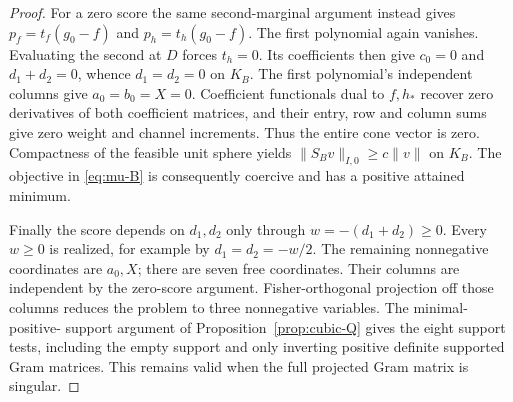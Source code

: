 \begin{proof}
For a zero score the same second-marginal argument instead gives
$p_f=t_f(g_0-f)$ and $p_h=t_h(g_0-f)$. The first polynomial again
vanishes. Evaluating the second at $D$ forces $t_h=0$. Its coefficients
then give $c_0=0$ and $d_1+d_2=0$, whence $d_1=d_2=0$ on $K_B$.
The first polynomial's independent columns give $a_0=b_0=X=0$.
Coefficient functionals dual to $f,h_*$ recover zero derivatives of both
coefficient matrices, and their entry, row and column sums give zero
weight and channel increments. Thus the entire cone vector is zero.
Compactness of the feasible unit sphere yields
$\|S_Bv\|_{I,0}\ge c\|v\|$ on $K_B$. The objective in
\eqref{eq:mu-B} is consequently coercive and has a positive attained
minimum.

Finally the score depends on $d_1,d_2$ only through
$w=-(d_1+d_2)\ge0$. Every $w\ge0$ is realized, for example by
$d_1=d_2=-w/2$. The remaining nonnegative coordinates are $a_0,X$;
there are seven free coordinates. Their columns are independent by the
zero-score argument. Fisher-orthogonal projection off those columns
reduces the problem to three nonnegative variables. The minimal-positive-
support argument of Proposition~\ref{prop:cubic-Q} gives the eight
support tests, including the empty support and only inverting positive
 definite supported Gram matrices. This remains valid when the full
projected Gram matrix is singular.
\end{proof}

